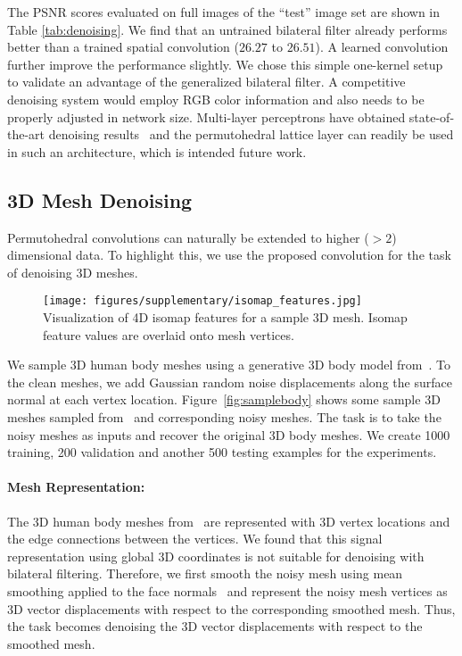The PSNR scores evaluated on full images of the ``test'' image set are
shown in Table \ref{tab:denoising}. We find that an untrained bilateral
filter already performs better than a trained spatial convolution
($26.27$ to $26.51$). A learned convolution further improve the
performance slightly. We chose this simple one-kernel setup to
validate an advantage of the generalized bilateral filter. A competitive
denoising system would employ RGB color information and also
needs to be properly adjusted in network size. Multi-layer perceptrons
have obtained state-of-the-art denoising results~\cite{burger12cvpr}
and the permutohedral lattice layer can readily be used in such an
architecture, which is intended future work.

\subsection{3D Mesh Denoising}\label{sec:mesh_denoising}

Permutohedral convolutions can naturally be extended to higher ($>2$)
dimensional data. To highlight this, we use the proposed convolution for the task
of denoising 3D meshes.

\begin{figure}[t!]
  \centering
    \texttt{[image: figures/supplementary/isomap\_features.jpg]}
  {Visualization of 4D isomap features for a sample 3D mesh. Isomap feature values are overlaid onto mesh vertices.}
  \label{fig:isomap}
\end{figure}

We sample 3D human body meshes using a
generative 3D body model from~\cite{SMPL:2015}. To the clean meshes, we add Gaussian random
noise displacements along the surface normal at each vertex location. Figure~\ref{fig:samplebody} shows
some sample 3D meshes sampled
from~\cite{SMPL:2015} and corresponding noisy meshes. The task is to take the noisy meshes as inputs and
recover the original 3D body meshes. We create 1000 training, 200 validation and another 500
testing examples for the experiments.

\paragraph{Mesh Representation:} The 3D human body meshes from~\cite{SMPL:2015} are represented with
3D vertex locations and the edge connections between the vertices. We found that this signal representation
using global 3D coordinates is not suitable for denoising with bilateral filtering. Therefore, we first
smooth the noisy mesh using mean smoothing applied to the face normals~\cite{yagou2002mesh} and represent the noisy
mesh vertices as 3D vector displacements with respect to the corresponding smoothed mesh. Thus, the
task becomes denoising the 3D vector displacements with respect to the smoothed mesh.

